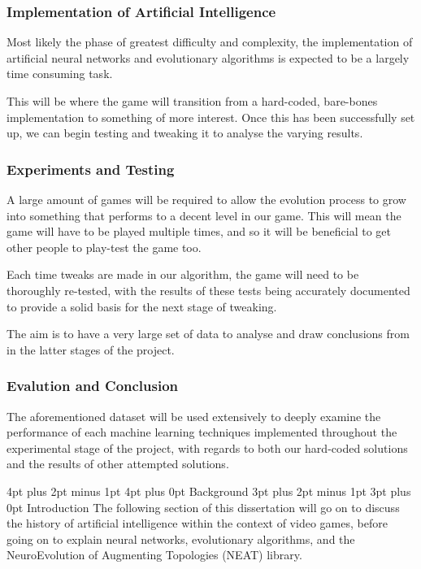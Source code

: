 \documentclass[12pt,a4paper]{article}
\makeatletter
\renewcommand\subsection{\@startsection {subsection}{1}{2mm} %
                               {3pt plus 2pt minus 1pt} %
                               {3pt plus 0pt} %
                               {\normalfont\bfseries}}
\renewcommand\section{\@startsection {section}{1}{0mm} %
                               {4pt plus 2pt minus 1pt} %
                               {4pt plus 0pt} %
                               {\bfseries}}
\makeatother
\begin{document}
\subsubsection{Implementation of Artificial Intelligence}
Most likely the phase of greatest difficulty and complexity, the implementation of artificial neural networks and evolutionary algorithms is expected to be a largely time consuming task. 

This will be where the game will transition from a hard-coded, bare-bones implementation to something of more interest. Once this has been successfully set up, we can begin testing and tweaking it to analyse the varying results.

\subsubsection{Experiments and Testing}
A large amount of games will be required to allow the evolution process to grow into something that performs to a decent level in our game. This will mean the game will have to be played multiple times, and so it will be beneficial to get other people to play-test the game too. 

Each time tweaks are made in our algorithm, the game will need to be thoroughly re-tested, with the results of these tests being accurately documented to provide a solid basis for the next stage of tweaking. 

The aim is to have a very large set of data to analyse and draw conclusions from in the latter stages of the project. 

\subsubsection{Evalution and Conclusion}
The aforementioned dataset will be used extensively to deeply examine the performance of each machine learning techniques implemented throughout the experimental stage of the project, with regards to both our hard-coded solutions and the results of other attempted solutions. 

\newpage
\section{Background}
\subsection{Introduction}
The following section of this dissertation will go on to discuss the history of artificial intelligence within the context of video games, before going on to explain neural networks, evolutionary algorithms, and the NeuroEvolution of Augmenting Topologies (NEAT) library.\\
\end{document}
